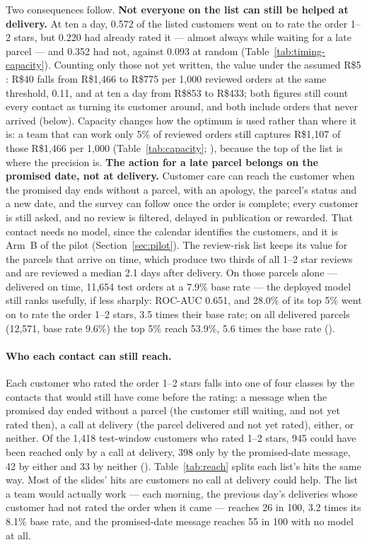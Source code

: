 Two consequences follow. \textbf{Not everyone on the list can still be helped at
delivery.} At ten a day, 0.572 of the listed customers went on to rate the order
1--2 stars, but 0.220 had already rated it --- almost always while waiting for a
late parcel --- and 0.352 had not, against 0.093 at random
(Table~\ref{tab:timing-capacity}). Counting only those not yet written, the value
under the assumed R\$5 : R\$40 falls from R\$1{,}466 to R\$775 per 1{,}000
reviewed orders at the same threshold, 0.11, and at ten a day from R\$853 to
R\$433; both figures still count every contact as turning its customer around,
and both include orders that never arrived (below). Capacity changes how the
optimum is used rather than where it is: a team that can work only 5\% of
reviewed orders still captures R\$1{,}107 of those R\$1{,}466 per 1{,}000
(Table~\ref{tab:capacity}; ), because the top of the list is where the precision
is.
\textbf{The action for a late parcel belongs on the promised date, not at
delivery.} Customer care can reach the customer when the promised day ends
without a parcel, with an apology, the parcel's status and a new date, and the
survey can follow once the order is complete; every customer is still asked, and
no review is filtered, delayed in publication or rewarded. That contact needs no
model, since the calendar identifies the customers, and it is Arm~B of the pilot
(Section~\ref{sec:pilot}). The review-risk list keeps its value for the parcels
that arrive on time, which produce two thirds of all 1--2 star reviews and are
reviewed a median 2.1 days after delivery. On those parcels alone --- delivered
on time, 11{,}654 test orders at a 7.9\% base rate --- the deployed model still
ranks usefully, if less sharply: ROC-AUC 0.651, and 28.0\% of its top 5\% went on
to rate the order 1--2 stars, 3.5 times their base rate; on all delivered parcels
(12{,}571, base rate 9.6\%) the top 5\% reach 53.9\%, 5.6 times the base rate
().

\paragraph{Who each contact can still reach.} Each customer who rated the order
1--2 stars falls into one of four classes by the contacts that would still have
come before the rating: a message when the promised day ended without a parcel
(the customer still waiting, and not yet rated then), a call at delivery (the
parcel delivered and not yet rated), either, or neither. Of the 1{,}418
test-window customers who rated 1--2 stars, 945 could have been reached only by a
call at delivery, 398 only by the promised-date message, 42 by either and 33 by
neither (). Table~\ref{tab:reach} splits each
list's hits the same way. Most of the slides' hits are customers no call at
delivery could help. The list a team would actually work --- each morning, the
previous day's deliveries whose customer had not rated the order when it came ---
reaches 26 in 100, 3.2 times its 8.1\% base rate, and
the promised-date message reaches 55 in 100 with no model at all.

